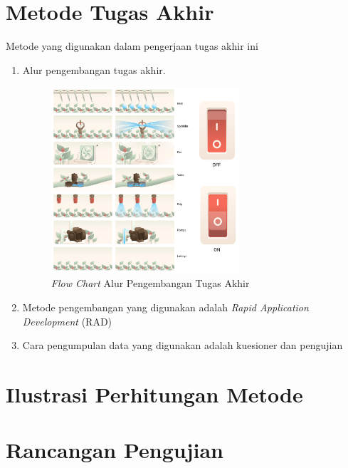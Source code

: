 \begin{flushleft}
\begin{justify}
      \section{Metode Tugas Akhir}
      Metode yang digunakan dalam pengerjaan tugas akhir ini
      \begin{enumerate}
         \item Alur pengembangan tugas akhir.
         \begin{figure}[ht]
            \centering
            \includegraphics[width=7cm]{images/UI/Frame 1.png}
            \caption{\textit{Flow Chart} Alur Pengembangan Tugas Akhir}
        \end{figure}
         \item Metode pengembangan yang digunakan adalah \textit{Rapid Application Development} (RAD)
         \item Cara pengumpulan data yang digunakan adalah kuesioner dan pengujian\\
      \end{enumerate}

      \section{Ilustrasi Perhitungan Metode}

      \section{Rancangan Pengujian}

   
   \end{justify}
   
\end{flushleft}


